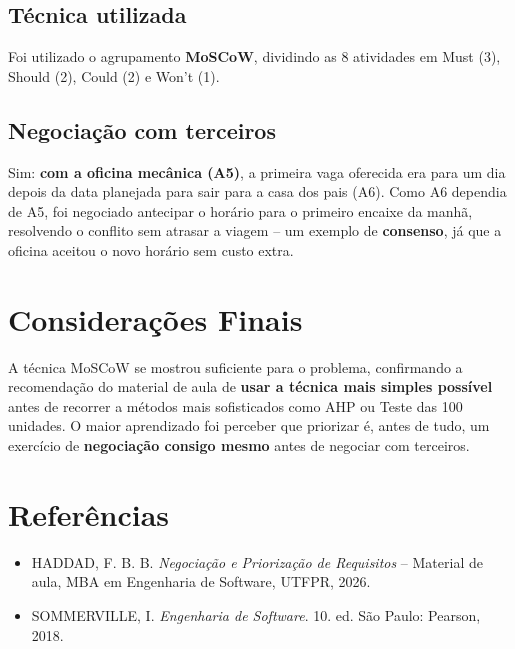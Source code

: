 \documentclass[12pt,a4paper]{article}
\begin{document}
\subsection*{Técnica utilizada}
Foi utilizado o agrupamento \textbf{MoSCoW}, dividindo as 8 atividades em Must (3), Should (2), Could (2) e Won't (1).

\subsection*{Negociação com terceiros}
Sim: \textbf{com a oficina mecânica (A5)}, a primeira vaga oferecida era para um dia depois da data planejada para sair para a casa dos pais (A6). Como A6 dependia de A5, foi negociado antecipar o horário para o primeiro encaixe da manhã, resolvendo o conflito sem atrasar a viagem -- um exemplo de \textbf{consenso}, já que a oficina aceitou o novo horário sem custo extra.

\section{Considerações Finais}
A técnica MoSCoW se mostrou suficiente para o problema, confirmando a recomendação do material de aula de \textbf{usar a técnica mais simples possível} antes de recorrer a métodos mais sofisticados como AHP ou Teste das 100 unidades. O maior aprendizado foi perceber que priorizar é, antes de tudo, um exercício de \textbf{negociação consigo mesmo} antes de negociar com terceiros.

\section*{Referências}
\begin{itemize}[nosep]
    \item HADDAD, F. B. B. \textit{Negociação e Priorização de Requisitos} -- Material de aula, MBA em Engenharia de Software, UTFPR, 2026.
    \item SOMMERVILLE, I. \textit{Engenharia de Software}. 10. ed. São Paulo: Pearson, 2018.
\end{itemize}
\end{document}
